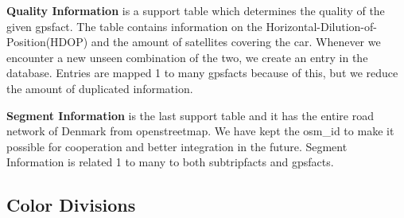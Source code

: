 \textbf{Quality Information} is a support table which determines the quality of the given gpsfact. The table contains information on the Horizontal-Dilution-of-Position(HDOP) and the amount of satellites covering the car. Whenever we encounter a new unseen combination of the two, we create an entry in the database. Entries are mapped 1 to many gpsfacts because of this, but we reduce the amount of duplicated information.

\textbf{Segment Information} is the last support table and it has the entire road network of Denmark from openstreetmap. We have kept the osm_id to make it possible for cooperation and better integration in the future. Segment Information is related 1 to many to both subtripfacts and gpsfacts.

\subsection{Color Divisions}